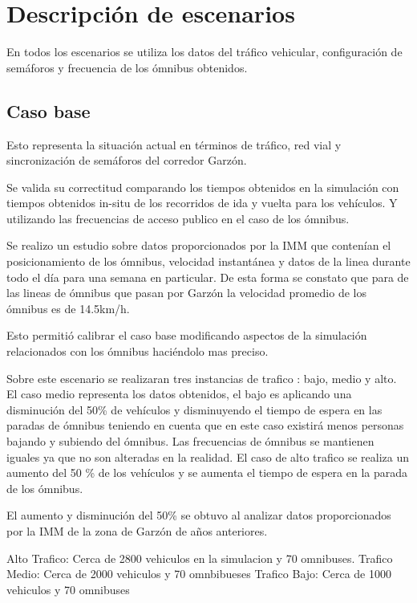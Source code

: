 \section{Descripción de escenarios}
En todos los escenarios se utiliza los datos del tráfico vehicular, configuración de semáforos y frecuencia de los ómnibus obtenidos. 

\subsection{Caso base}
Esto representa la situación actual en términos de tráfico, red vial y sincronización de semáforos del corredor Garzón. 

Se valida su correctitud comparando los tiempos obtenidos en la simulación con tiempos obtenidos in-situ de los recorridos de ida y vuelta para los vehículos. Y utilizando las frecuencias de acceso publico en el caso de los ómnibus.

Se realizo un estudio sobre datos proporcionados por la IMM que contenían el posicionamiento de los ómnibus, velocidad instantánea y datos de la linea durante todo el día para una semana en particular. De esta forma se constato que para de las lineas de ómnibus que pasan por Garzón la  velocidad promedio de los ómnibus es de 14.5km/h.

Esto permitió calibrar el caso base modificando aspectos de la simulación relacionados con los ómnibus haciéndolo mas preciso.

Sobre este escenario se realizaran tres instancias de trafico : bajo, medio y alto.
El caso medio representa los datos obtenidos, el bajo es aplicando una disminución del 50\% de vehículos y disminuyendo el tiempo de espera en las paradas de ómnibus teniendo en cuenta que en este caso existirá menos personas bajando y subiendo del ómnibus. Las frecuencias de ómnibus se mantienen iguales ya que no son alteradas en la realidad.
El caso de alto trafico se realiza un aumento del 50 \% de los vehículos y se aumenta el tiempo de espera en la parada de los ómnibus.

El aumento y disminución del 50\% se obtuvo al analizar datos proporcionados por la IMM de la zona de Garzón de años anteriores. \newline

Alto Trafico: Cerca de 2800 vehiculos en la simulacion y 70 omnibuses. \newline
Trafico Medio: Cerca de 2000 vehiculos y 70 omnbibueses \newline
Trafico Bajo: Cerca de 1000 vehiculos y 70 omnibuses
 

